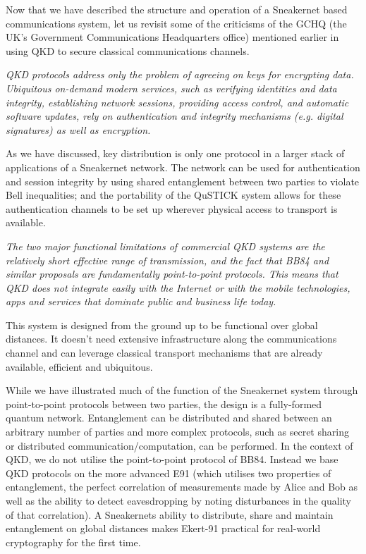\documentclass[twocolumn, aps, rmp, amsmath, amssymb, nofootinbib, superscriptaddress, longbibliography, floatfix, table-of-contents, eqsecnum]{revtex4-2}
\begin{document}
Now that we have described the structure and operation of a Sneakernet based communications system, let us revisit some of the criticisms of the GCHQ (the UK's Government Communications Headquarters office) mentioned earlier in using QKD to secure classical communications channels. 

{\em QKD protocols address only the problem of agreeing on keys for encrypting data. Ubiquitous on-demand modern services, such as verifying identities and data integrity, establishing network sessions, providing access control, and automatic software updates, rely on authentication and integrity mechanisms (e.g. digital signatures) as well as encryption.}

As we have discussed, key distribution is only one protocol in a larger stack of applications of a Sneakernet network. The network can be used for authentication and session integrity by using shared entanglement between two parties to violate Bell inequalities; and the portability of the QuSTICK system allows for these authentication channels to be set up wherever physical access to transport is available.

{\em The two major functional limitations of commercial QKD systems are the relatively short effective range of transmission, and the fact that BB84 and similar proposals are fundamentally point-to-point protocols. This means that QKD does not integrate easily with the Internet or with the mobile technologies, apps and services that dominate public and business life today.}

This system is designed from the ground up to be functional over global distances. It doesn't need extensive infrastructure along the communications channel and can leverage classical transport mechanisms that are already available, efficient and ubiquitous. 

While we have illustrated much of the function of the Sneakernet system through point-to-point protocols between two parties, the design is a fully-formed quantum network. Entanglement can be distributed and shared between an arbitrary number of parties and more complex protocols, such as secret sharing or distributed communication/computation, can be performed. In the context of QKD, we do not utilise the point-to-point protocol of BB84. Instead we base QKD protocols on the more advanced E91 (which utilises two properties of entanglement, the perfect correlation of measurements made by Alice and Bob as well as the ability to detect eavesdropping by noting disturbances in the quality of that correlation). A Sneakernets ability to distribute, share and maintain entanglement on global distances makes Ekert-91 practical for real-world cryptography for the first time.
\end{document}
